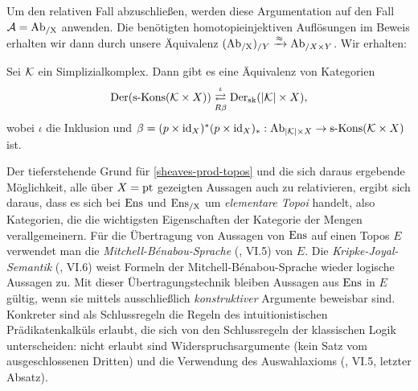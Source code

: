 Um den relativen Fall abzuschließen, werden diese Argumentation auf
den Fall $\mathcal{A} = \operatorname{Ab_{/X}}$ anwenden. Die benötigten
homotopieinjektiven Auflösungen im Beweis erhalten wir dann durch
unsere Äquivalenz $(\operatorname{Ab_{/X}})_{/Y} \xrightarrow{\approx} \operatorname{Ab}_{/X \times Y}$. Wir erhalten:
\begin{theorem} \label{dersk-eq-rel}
  Sei $\mathcal{K}$ ein Simplizialkomplex. Dann gibt es eine Äquivalenz von
  Kategorien
  \[ \operatorname{Der}(\operatorname{s-Kons}(\mathcal{K} \times X))
     \mathrel{\mathop{\rightleftarrows}^{\iota}_{R \beta}}
     \operatorname{Der}_{\mathrm{sk}}(|\mathcal{K}| \times X),
  \]
  wobei $\iota$ die Inklusion und $\beta = (p \times \operatorname{id}_X)^* (p
  \times \operatorname{id}_X)_*: \operatorname{Ab}_{|\mathcal{K}| \times X} \to \operatorname{s-Kons}(\mathcal{K} \times X)$ ist.
\end{theorem}
\begin{bem}
  Der tieferstehende Grund für \ref{sheaves-prod-topos} und die sich
  daraus ergebende Möglichkeit, alle über $X = \operatorname{pt}$ gezeigten
  Aussagen auch zu relativieren, ergibt sich daraus, dass es sich bei
  $\operatorname{Ens}$ und $\operatorname{Ens_{/X}}$ um \emph{elementare Topoi} handelt, also
  Kategorien, die die wichtigsten Eigenschaften der Kategorie der
  Mengen verallgemeinern. Für die Übertragung von Aussagen von $\operatorname{Ens}$
  auf einen Topos $E$ verwendet man die
  \emph{Mitchell-Bénabou-Sprache} (\cite{MoerTopoi}, VI.5) von
  $E$. Die \emph{Kripke-Joyal-Semantik} (\cite{MoerTopoi}, VI.6) weist
  Formeln der Mitchell-Bénabou-Sprache wieder logische Aussagen
  zu. Mit dieser Übertragungstechnik bleiben Aussagen aus $\operatorname{Ens}$ in
  $E$ gültig, wenn sie mittels ausschließlich \emph{konstruktiver}
  Argumente beweisbar sind. Konkreter sind als Schlussregeln die
  Regeln des intuitionistischen Prädikatenkalküls erlaubt, die sich
  von den Schlussregeln der klassischen Logik unterscheiden: nicht
  erlaubt sind Widerspruchsargumente (kein Satz vom ausgeschlossenen
  Dritten) und die Verwendung des Auswahlaxioms (\cite{MoerTopoi},
  VI.5, letzter Absatz).
\end{bem}
